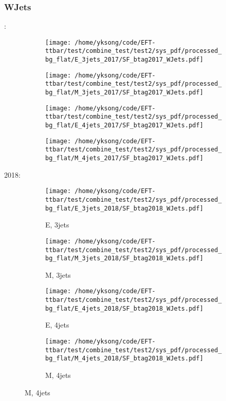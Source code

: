 \documentclass{beamer}
\begin{document}
\begin{frame}
\frametitle{WJets}
\fontsize{5}{1}:
\begin{figure}
\centering
\begin{subfigure}[b]{0.24\textwidth}
\texttt{[image: /home/yksong/code/EFT-ttbar/test/combine\_test/test2/sys\_pdf/processed\_bg\_flat/E\_3jets\_2017/SF\_btag2017\_WJets.pdf]}
\end{subfigure}
\begin{subfigure}[b]{0.24\textwidth}
\texttt{[image: /home/yksong/code/EFT-ttbar/test/combine\_test/test2/sys\_pdf/processed\_bg\_flat/M\_3jets\_2017/SF\_btag2017\_WJets.pdf]}
\end{subfigure}
\begin{subfigure}[b]{0.24\textwidth}
\texttt{[image: /home/yksong/code/EFT-ttbar/test/combine\_test/test2/sys\_pdf/processed\_bg\_flat/E\_4jets\_2017/SF\_btag2017\_WJets.pdf]}
\end{subfigure}
\begin{subfigure}[b]{0.24\textwidth}
\texttt{[image: /home/yksong/code/EFT-ttbar/test/combine\_test/test2/sys\_pdf/processed\_bg\_flat/M\_4jets\_2017/SF\_btag2017\_WJets.pdf]}
\end{subfigure}
\end{figure}
2018:
\begin{figure}
\centering
\begin{subfigure}[b]{0.24\textwidth}
\texttt{[image: /home/yksong/code/EFT-ttbar/test/combine\_test/test2/sys\_pdf/processed\_bg\_flat/E\_3jets\_2018/SF\_btag2018\_WJets.pdf]}
\captionsetup{font=tiny}
\caption{E, 3jets}
\end{subfigure}
\begin{subfigure}[b]{0.24\textwidth}
\texttt{[image: /home/yksong/code/EFT-ttbar/test/combine\_test/test2/sys\_pdf/processed\_bg\_flat/M\_3jets\_2018/SF\_btag2018\_WJets.pdf]}
\captionsetup{font=tiny}
\caption{M, 3jets}
\end{subfigure}
\begin{subfigure}[b]{0.24\textwidth}
\texttt{[image: /home/yksong/code/EFT-ttbar/test/combine\_test/test2/sys\_pdf/processed\_bg\_flat/E\_4jets\_2018/SF\_btag2018\_WJets.pdf]}
\captionsetup{font=tiny}
\caption{E, 4jets}
\end{subfigure}
\begin{subfigure}[b]{0.24\textwidth}
\texttt{[image: /home/yksong/code/EFT-ttbar/test/combine\_test/test2/sys\_pdf/processed\_bg\_flat/M\_4jets\_2018/SF\_btag2018\_WJets.pdf]}
\captionsetup{font=tiny}
\caption{M, 4jets}
\end{subfigure}
\end{figure}
\end{frame}
\end{document}
